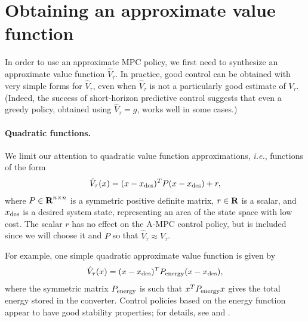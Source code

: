 \documentclass[12pt]{article}
\newcommand{\ie}{{\it i.e.}}
\newcommand{\reals}{{\mbox{\bf R}}}
\begin{document}
\section{Obtaining an approximate value function}
\label{s-deriving-value-function}
In order to use an approximate MPC policy,
we first need to synthesize an approximate value function $\hat V_\tau$.
In practice, good control can be obtained with very simple forms for $\hat V_\tau$,
even when $\hat V_\tau$ is not a particularly good estimate of $V_\tau$.
(Indeed, the success of short-horizon predictive control 
suggests that even a greedy policy, obtained using $\hat V_\tau = g$, works well
in some cases.)

\paragraph{Quadratic functions.}
We limit our attention to quadratic value function approximations,
\ie, functions of the form
\begin{align}
\label{e-quad-value-fun}
\hat V_\tau(x) = (x - x_{\rm des})^T P (x - x_{\rm des}) + r,
\end{align}
where $P \in \reals^{n\times n}$ is a symmetric positive definite matrix,
$r\in \reals$ is a scalar,
and
$x_{\rm des}$ is a desired system state,
representing an area of the state space with low cost.
The scalar $r$ has no effect on the A-MPC control policy, but is included
since we will choose it and $P$ so that $\hat V_\tau \approx V_\tau$.

For example, one simple quadratic approximate value function is given by
\begin{align}
\label{e-vhat-energy}
\hat V_\tau(x) = (x - x_{\rm des})^T P_{\rm energy} (x - x_{\rm des}),
\end{align}
where the symmetric matrix $P_{\rm energy}$ is such that
$x^T P_{\rm energy} x$ gives the total energy stored in the converter.
Control policies based on the energy function appear
to have good stability properties;
for details, see \cite{sanders1992lyapunov} and \cite{midya1992optimal}.
\end{document}
